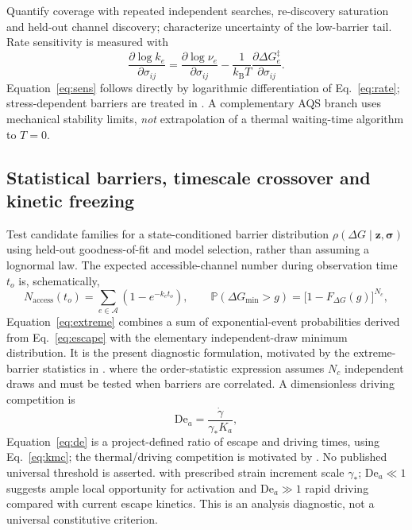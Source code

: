 \documentclass[11pt,a4paper]{article}
\begin{document}
Quantify coverage with repeated independent searches, re-discovery saturation and held-out channel discovery; characterize uncertainty of the low-barrier tail. Rate sensitivity is measured with
\begin{equation}
 \frac{\partial\log k_e}{\partial\sigma_{ij}}
 =\frac{\partial\log\nu_e}{\partial\sigma_{ij}}-
 \frac{1}{k_\mathrm BT}\frac{\partial\Delta G_e^\ddagger}{\partial\sigma_{ij}}.\label{eq:sens}
\end{equation}
Equation~\eqref{eq:sens} follows directly by logarithmic differentiation of Eq.~\eqref{eq:rate}; stress-dependent barriers are treated in \cite{sway2016}.
A complementary AQS branch uses mechanical stability limits, \emph{not} extrapolation of a thermal waiting-time algorithm to $T=0$.

\subsection{Statistical barriers, timescale crossover and kinetic freezing}
Test candidate families for a state-conditioned barrier distribution $\rho(\Delta G\mid\mathbf z,\bm\sigma)$ using held-out goodness-of-fit and model selection, rather than assuming a lognormal law. The expected accessible-channel number during observation time $t_o$ is, schematically,
\begin{equation}
 N_\mathrm{access}(t_o)=\sum_{e\in\mathcal A}
 \left(1-e^{-k_e t_o}\right),\qquad
 \mathbb P(\Delta G_{\min}>g)=\big[1-F_{\Delta G}(g)\big]^{N_c},\label{eq:extreme}
\end{equation}
Equation~\eqref{eq:extreme} combines a sum of exponential-event probabilities derived from Eq.~\eqref{eq:escape} with the elementary independent-draw minimum distribution. It is the present diagnostic formulation, motivated by the extreme-barrier statistics in \cite{derlet2013,derlet2014}.
where the order-statistic expression assumes $N_c$ independent draws and must be tested when barriers are correlated. A dimensionless driving competition is
\begin{equation}
 \mathrm{De}_a=\frac{\dot\gamma}{\gamma_* K_a},\label{eq:de}
\end{equation}
Equation~\eqref{eq:de} is a project-defined ratio of escape and driving times, using Eq.~\eqref{eq:kmc}; the thermal/driving competition is motivated by \cite{derlet2013}. No published universal threshold is asserted.
with prescribed strain increment scale $\gamma_*$; $\mathrm{De}_a\ll1$ suggests ample local opportunity for activation and $\mathrm{De}_a\gg1$ rapid driving compared with current escape kinetics. This is an analysis diagnostic, not a universal constitutive criterion.
\end{document}

